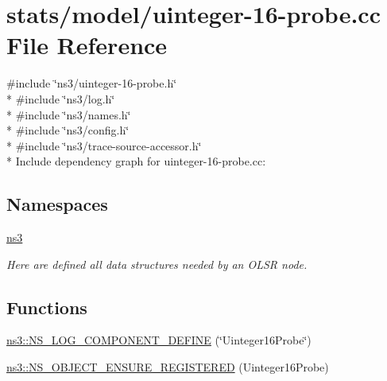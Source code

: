 \hypertarget{uinteger-16-probe_8cc}{}\section{stats/model/uinteger-\/16-\/probe.cc File Reference}
\label{uinteger-16-probe_8cc}
{\ttfamily \#include \char`\"{}ns3/uinteger-\/16-\/probe.\+h\char`\"{}}\\*
{\ttfamily \#include \char`\"{}ns3/log.\+h\char`\"{}}\\*
{\ttfamily \#include \char`\"{}ns3/names.\+h\char`\"{}}\\*
{\ttfamily \#include \char`\"{}ns3/config.\+h\char`\"{}}\\*
{\ttfamily \#include \char`\"{}ns3/trace-\/source-\/accessor.\+h\char`\"{}}\\*
Include dependency graph for uinteger-\/16-\/probe.cc\+:
\subsection*{Namespaces}
\begin{DoxyCompactItemize}
\item 
 \hyperlink{namespacens3}{ns3}
\begin{DoxyCompactList}\small\item\em Here are defined all data structures needed by an O\+L\+SR node. \end{DoxyCompactList}\end{DoxyCompactItemize}
\subsection*{Functions}
\begin{DoxyCompactItemize}
\item 
\hyperlink{namespacens3_a10f3e662165631745a3b9a5da21ca6aa}{ns3\+::\+N\+S\+\_\+\+L\+O\+G\+\_\+\+C\+O\+M\+P\+O\+N\+E\+N\+T\+\_\+\+D\+E\+F\+I\+NE} (\char`\"{}Uinteger16\+Probe\char`\"{})
\item 
\hyperlink{namespacens3_a294ab2d49825bfb467bd0b4d02e41c58}{ns3\+::\+N\+S\+\_\+\+O\+B\+J\+E\+C\+T\+\_\+\+E\+N\+S\+U\+R\+E\+\_\+\+R\+E\+G\+I\+S\+T\+E\+R\+ED} (Uinteger16\+Probe)
\end{DoxyCompactItemize}
